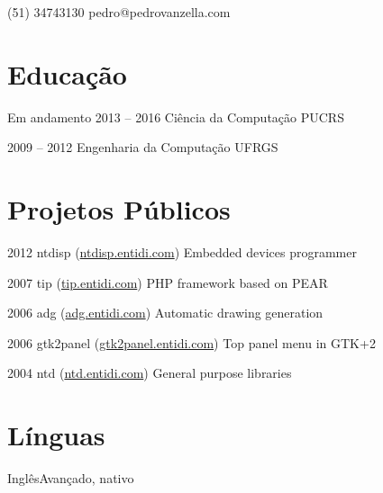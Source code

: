 \documentclass{tccv}
\begin{document}
    {(51) 34743130}
    {pedro@pedrovanzella.com}

\section{Educação}

\begin{yearlist}

\item[Em andamento]{2013 -- 2016}
     {Ciência da Computação}
     {PUCRS}

\item{2009 -- 2012}
     {Engenharia da Computação}
     {UFRGS}

\end{yearlist}

\section{Projetos Públicos}

\begin{yearlist}

\item{2012}
     {ntdisp (\href{http://ntdisp.entidi.com/}{ntdisp.entidi.com})}
     {Embedded devices programmer}

\item{2007}
     {tip (\href{http://tip.entidi.com/}{tip.entidi.com})}
     {PHP framework based on PEAR}

\item{2006}
     {adg (\href{http://adg.entidi.com/}{adg.entidi.com})}
     {Automatic drawing generation}

\item{2006}
     {gtk2panel (\href{http://gtk2panel.entidi.com/}{gtk2panel.entidi.com})}
     {Top panel menu in GTK+2}

\item{2004}
     {ntd (\href{http://ntd.entidi.com/}{ntd.entidi.com})}
     {General purpose libraries}

\end{yearlist}

\section{Línguas}

\begin{factlist}
\item{Inglês}{Avançado, nativo}
\end{factlist}
\end{document}
